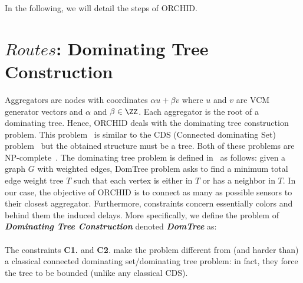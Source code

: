 In the following, we will detail the steps of ORCHID.

\section{$Routes$: Dominating Tree Construction}\label{sec:aggregators}
Aggregators are nodes with coordinates $\alpha u+\beta v$ where $u$ and $v$ are VCM generator vectors and $\alpha$ and $\beta \in \ZZ$. Each aggregator is the root of a dominating tree.
Hence, ORCHID deals with the dominating tree construction problem. This problem~\cite{CDSExample1, CDSExample2} is similar to the CDS (Connected dominating Set) problem~\cite{CDSSurvey} but the obtained structure must be a tree. Both of these problems are NP-complete~\cite{CDSSurvey, CDSExample1}. The dominating tree problem is defined in~\cite{CDSExample1} as follows: given a graph $G$ with weighted edges, DomTree problem asks to find a minimum total edge weight tree $T$ such that each vertex is either in $T$ or has a neighbor in $T$. In our case, the objective of ORCHID is to connect as many as possible sensors to their closest aggregator. Furthermore, constraints concern essentially colors and behind them the induced delays. More specifically, we define the problem of \textbf{\textit{Dominating Tree Construction}} denoted \textbf{\textit{DomTree}} as: \\
~~\\
The constraints \textbf{C1.} and \textbf{C2}. make the problem different
from (and harder than) a classical connected dominating set/dominating tree 
problem: in fact, they force the tree to be bounded (unlike any 
classical CDS). \\





